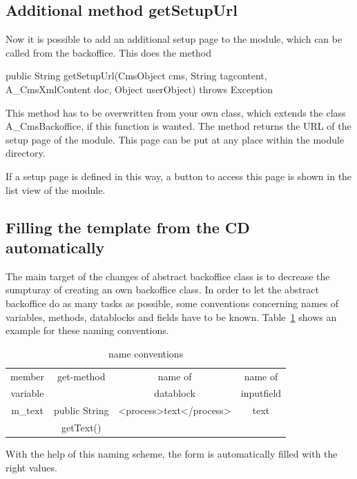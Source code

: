 \subsection{Additional method getSetupUrl}
Now it is possible to add an additional setup page to the module, which can be
called from the backoffice. This does the method

\begin{java}
public String getSetupUrl(CmsObject cms, String tagcontent, A\_CmsXmlContent doc, 
Object userObject) throws Exception
\end{java}

This method has to be overwritten from your own class, which extends the class
{\name A\_Cms\-Backoffice}, if this function is wanted. The method returns the URL 
of the setup page of the module. This page can be put at any place within the module
directory.

If a setup page is defined in this way, a button to access this page is shown in 
the list view of the module.

\subsection{Filling the template from the CD automatically}
The main target of the changes of abstract backoffice class is to decrease the
sumpturay of creating an own backoffice class. In order to let the abstract backoffice
do as many tasks as possible, some conventions concerning names of variables, methods,
datablocks and fields have to be known.
Table~\ref{nameConv} shows an example for these naming conventions.

\begin{table}
\begin{center}
\begin{tabular}{|c|c|c|c|}
\hline
member &
get-method&
name of&  
name of \\
variable&
&
datablock&
inputfield\\ \hline  
m\_text&
public String&
<process>text</process>&
text\\
&
getText()&
&  \\ \hline
\end{tabular}
\caption[name conventions]{name conventions}
\label{nameConv}
\end{center} 
\end{table}

With the help of this naming scheme, the form is automatically filled with the right
values.

